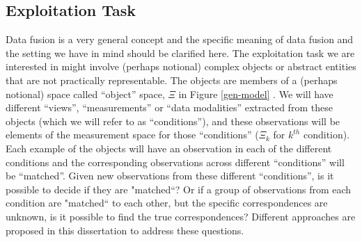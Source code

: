 \documentclass[12pt,oneside,final]{thesis}\usepackage[]{graphicx}\usepackage[]{color}
\begin{document}
\subsection{Exploitation Task}
Data fusion is a very general concept and the specific meaning of data fusion and the setting we have in mind should be clarified here. The exploitation task we are interested in might involve (perhaps notional) complex objects or abstract entities that are not practically representable. The objects are members of a (perhaps notional) space called ``object'' space, $\Xi$ in Figure \ref{gen-model} . We will have different ``views'', ``measurements'' or ``data modalities'' extracted from these objects (which we will refer to as ``conditions''), and these observations will be elements of the measurement space for those ``conditions'' ($\Xi_k$ for $k^{th}$ condition). Each example of the objects will have an observation in each of the different conditions and the corresponding observations across different ``conditions'' will be ``matched''. Given new observations from these different ``conditions'', is it possible to decide if they are "matched``? Or if a group of  observations from each condition are "matched`` to each other, but the specific correspondences are unknown, is it possible to find the true correspondences? Different approaches are proposed in this dissertation to address these questions.
\label{subsec:task}
\end{document}
